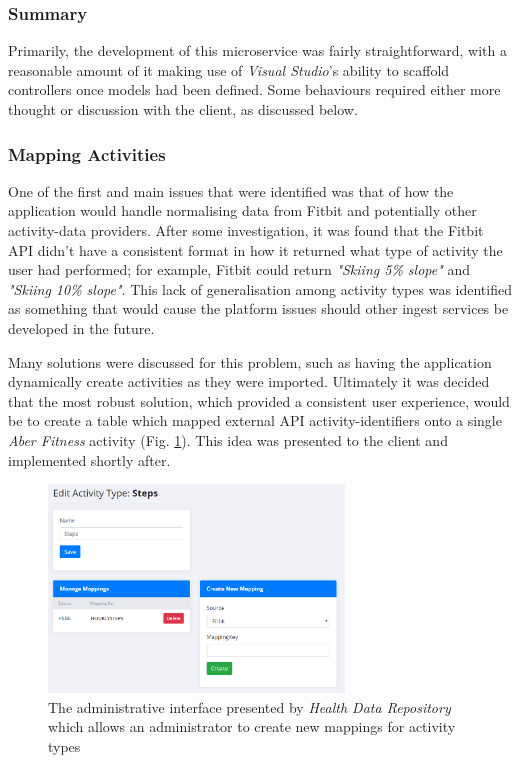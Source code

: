\subsubsection{Summary}
Primarily, the development of this microservice was fairly straightforward, with a reasonable amount of it making use of \textit{Visual Studio}'s ability to scaffold controllers once models had been defined. Some behaviours required either more thought or discussion with the client, as discussed below.

\subsubsection{Mapping Activities}

One of the first and main issues that were identified was that of how the application would handle normalising data from Fitbit and potentially other activity-data providers. After some investigation, it was found that the Fitbit API didn't have a consistent format in how it returned what type of activity the user had performed; for example, Fitbit could return \textit{"Skiing 5\% slope"} and \textit{"Skiing 10\% slope"}. This lack of generalisation among activity types was identified as something that would cause the platform issues should other ingest services be developed in the future. 

Many solutions were discussed for this problem, such as having the application dynamically create activities as they were imported. Ultimately it was decided that the most robust solution, which provided a consistent user experience, would be to create a table which mapped external API activity-identifiers onto a single \textit{Aber Fitness} activity (Fig. \ref{fig:health_mappings}). This idea was presented to the client and implemented shortly after.

\begin{figure}[H]
    \centering
    \includegraphics[width=0.7\textwidth]{Images/Chpt5_HealthData_Mapping.png}
    \caption{The administrative interface presented by \textit{Health Data Repository} which allows an administrator to create new mappings for activity types}
    \label{fig:health_mappings}
\end{figure}

